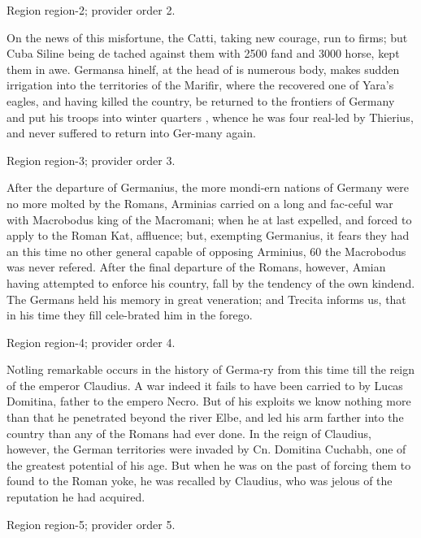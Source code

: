 \documentclass[11pt]{article}
\begin{document}
{\scriptsize\color{gray} Region region-2; provider order 2.\par}
\medskip

On the news of this misfortune, the Catti, taking new courage, run to firms; but Cuba Siline being de tached against them with 2500 fand and 3000 horse, kept them in awe. Germansa hinelf, at the head of is numerous body, makes sudden irrigation into the territories of the Marifir, where the recovered one of Yara's eagles, and having killed the country, be returned to the frontiers of Germany and put his troops into winter quarters , whence he was four real-led by Thierius, and never suffered to return into Ger-many again.
\par

{\scriptsize\color{gray} Region region-3; provider order 3.\par}
\medskip

After the departure of Germanius, the more mondi-ern nations of Germany were no more molted by the Romans, Arminias carried on a long and fac-ceful war with Macrobodus king of the Macromani; when he at last expelled, and forced to apply to the Roman Kat, affluence; but, exempting Germanius, it fears they had an this time no other general capable of opposing Arminius, 60 the Macrobodus was never refered. After the final departure of the Romans, however, Amian having attempted to enforce his country, fall by the tendency of the own kindend. The Germans held his memory in great veneration; and Trecita informs us, that in his time they fill cele-brated him in the forego.
\par

{\scriptsize\color{gray} Region region-4; provider order 4.\par}
\medskip

Notling remarkable occurs in the history of Germa-ry from this time till the reign of the emperor Claudius. A war indeed it fails to have been carried to by Lucas Domitina, father to the empero Necro. But of his exploits we know nothing more than that he penetrated beyond the river Elbe, and led his arm farther into the country than any of the Romans had ever done. In the reign of Claudius, however, the German territories were invaded by Cn. Domitina Cuchabh, one of the greatest potential of his age. But when he was on the past of forcing them to found to the Roman yoke, he was recalled by Claudius, who was jelous of the reputation he had acquired.
\par

{\scriptsize\color{gray} Region region-5; provider order 5.\par}
\medskip
\end{document}

